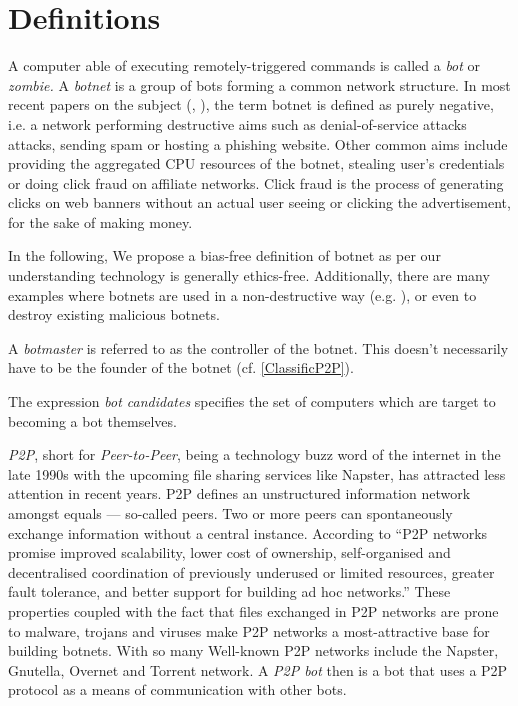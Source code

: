 \documentclass{llncs}
\begin{document}
\section{Definitions}
A computer able of executing remotely-triggered commands is called a
{\it bot} or {\it zombie.} A {\it botnet} is a group of bots forming a
common network structure.\cite{schoof2007detecting} In most recent
papers on the subject (\cite{wang2009systematic},
\cite{abu2006multifaceted}), the term botnet is defined as purely
negative, i.e. a network performing destructive aims such as
denial-of-service attacks attacks, sending spam or hosting a phishing
website\cite{steggink2007detection}. Other common aims include
providing the aggregated CPU resources of the botnet, stealing user's
credentials \cite{borgaonkar2010analysis} or doing click fraud on
affiliate networks\cite{clickFraud}. Click fraud is the process of
generating clicks on web banners without an actual user seeing or
clicking the advertisement, for the sake of making money. 

In the following, We propose a bias-free definition of botnet as per
our understanding technology is generally ethics-free. Additionally,
there are many examples where botnets are used in a non-destructive
way (e.g. \cite{seti}), or even to destroy existing malicious botnets.

A {\it botmaster} is referred to as the controller of the botnet. This
doesn't necessarily have to be the founder of the botnet (cf. \ref{ClassificP2P}).

The expression {\it bot candidates} specifies the set of computers
which are target to becoming a bot themselves.

{\it P2P}, short for {\it Peer-to-Peer}, being a technology buzz word
of the internet in the late 1990s with the upcoming file sharing
services like Napster\cite{napster}, has attracted less attention in
recent years. P2P defines an unstructured information network
amongst equals --- so-called peers. Two or more peers can
spontaneously exchange information without a central
instance. According to \cite{schoder2005core} ``P2P networks promise
improved scalability, lower cost of ownership, self-organised and
decentralised coordination of previously underused or limited
resources, greater fault tolerance, and better support for building ad
hoc networks.''  These properties coupled with the fact that files
exchanged in P2P networks are prone to malware, trojans and viruses
make P2P networks a most-attractive base for building botnets. With so many 
Well-known P2P networks include the Napster\cite{napster}, Gnutella,
Overnet and Torrent network.  A {\it P2P bot} then is a bot that uses
a P2P protocol as a means of communication with other bots.
\end{document}
